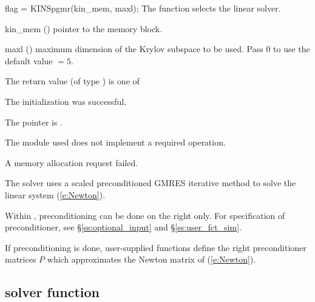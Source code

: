 {
  flag = KINSpgmr(kin\_mem, maxl);
}
{
  The function  selects the {\kinspgmr} linear solver. 
}
{
  \begin{args}
  \item[kin\_mem] ()
    pointer to the {\kinsol} memory block.
  \item[maxl] ()
    maximum dimension of the Krylov subspace to be used. Pass $0$ to use the 
    default value $=5$.
  \end{args}
}
{
  The return value  (of type ) is one of
  \begin{args}
  \item[\Id{KINSPGMR\_SUCCESS}] 
    The {\kinspgmr} initialization was successful.
  \item[\Id{KINSPGMR\_MEM\_NULL}]
    The  pointer is .
  \item[\Id{KINSPGMR\_ILL\_INPUT}]
    The {\nvector} module used does not implement a required operation.
  \item[\Id{KINSPGMR\_MEM\_FAIL}]
    A memory allocation request failed.
  \end{args}
}
{
  The {\kinspgmr} solver uses a scaled preconditioned GMRES
  iterative method to solve the linear system (\ref{e:Newton}).

  Within {\kinsol}, preconditioning can be done on the right only.
  For specification of preconditioner,
  see \S\ref{ss:optional_input} and \S\ref{ss:user_fct_sim}.

  If preconditioning is done, user-supplied functions define the right 
  preconditioner matrices $P$ which approximates the Newton matrix
  of (\ref{e:Newton}).
}

\subsection{{\kinsol} solver function}\label{ss:kinsol}

